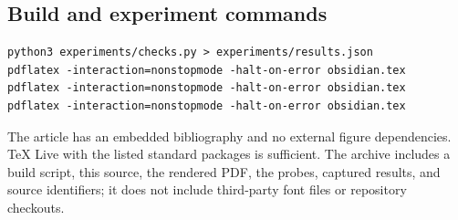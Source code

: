\documentclass[11pt,a4paper]{article}
\theoremstyle{plain}\newtheorem{proposition}{Proposition}[section]
\theoremstyle{definition}\newtheorem{definition}[proposition]{Definition}
\theoremstyle{remark}\newtheorem{remark}[proposition]{Remark}
\begin{document}
\subsection*{Build and experiment commands}
\begin{lstlisting}
python3 experiments/checks.py > experiments/results.json
pdflatex -interaction=nonstopmode -halt-on-error obsidian.tex
pdflatex -interaction=nonstopmode -halt-on-error obsidian.tex
pdflatex -interaction=nonstopmode -halt-on-error obsidian.tex
\end{lstlisting}
The article has an embedded bibliography and no external figure dependencies. TeX Live with the listed standard packages is sufficient. The archive includes a build script, this source, the rendered PDF, the probes, captured results, and source identifiers; it does not include third-party font files or repository checkouts.
\end{document}
